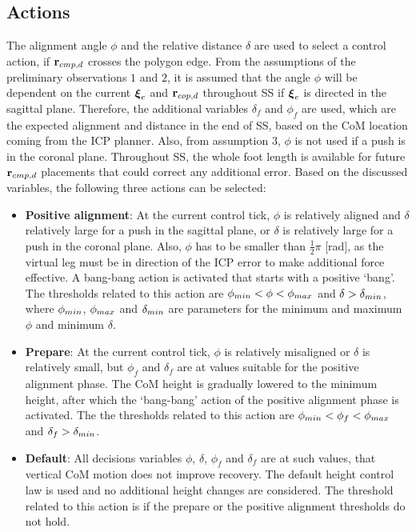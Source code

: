 \subsection{Actions}
The alignment angle $\phi$ and the relative distance $\delta$ are used to select a control action, if $\mathbf{r}_{cmp,d}$ crosses the polygon edge. From the assumptions of the preliminary observations $1$ and $2$, it is assumed that the angle $\phi$ will be dependent on the current $\boldsymbol{\xi}_e$ and $\mathbf{r}_{cop,d}$ throughout \ac{SS} if $\boldsymbol{\xi}_e$ is directed in the sagittal plane. Therefore, the additional variables $\delta_f$ and $\phi_f$ are used, which are the expected alignment and distance in the end of \ac{SS}, based on the \ac{CoM} location coming from the \ac{ICP} planner. Also, from assumption $3$, $\phi$ is not used if a push is in the coronal plane. Throughout \ac{SS}, the whole foot length is available for future $\mathbf{r}_{cmp,d}$ placements that could correct any additional error. Based on the discussed variables, the following three actions can be selected:
\begin{itemize}
	\item \textbf{Positive alignment}: At the current control tick, $\phi$ is relatively aligned and $\delta$ relatively large for a push in the sagittal plane, or $\delta$ is relatively large for a push in the coronal plane. Also, $\phi$ has to be smaller than $\frac{1}{2}\pi$ [rad], as the virtual leg must be in direction of the \ac{ICP} error to make additional force effective. A bang-bang action is activated that starts with a positive `bang'. The thresholds related to this action are $\phi_{min} < \phi < \phi_{max}$ and $\delta > \delta_{min}$, where $\phi_{min}$, $\phi_{max}$ and $\delta_{min}$ are parameters for the minimum and maximum $\phi$ and minimum $\delta$.
	\item \textbf{Prepare}: At the current control tick, $\phi$ is relatively misaligned or $\delta$ is relatively small, but $\phi_f$ and $\delta_f$ are at values suitable for the positive alignment phase. The \ac{CoM} height is gradually lowered to the minimum height, after which the `bang-bang' action of the positive alignment phase is activated. The the thresholds related to this action are $\phi_{min}<\phi_f<\phi_{max}$ and $\delta_f>\delta_{min}$.
	\item \textbf{Default}: All decisions variables $\phi$, $\delta$, $\phi_f$ and $\delta_f$ are at such values, that vertical \ac{CoM} motion does not improve recovery. The default height control law is used and no additional height changes are considered. The threshold related to this action is if the prepare or the positive alignment thresholds do not hold.
\end{itemize}

